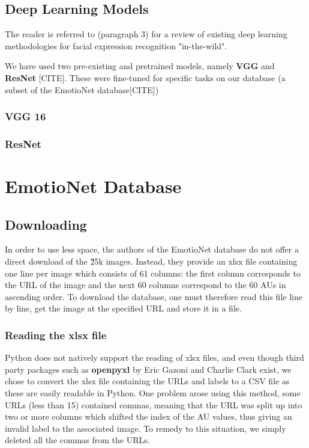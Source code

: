 \documentclass[12pt,twoside]{article}
\begin{document}
\subsection{Deep Learning Models}

The reader is referred to \cite{RefWorks:2} (paragraph 3) for a review of existing deep learning methodologies for facial expression recognition "in-the-wild".

We have used two pre-existing and pretrained models, namely \textbf{VGG} \cite{RefWorks:21} and
\textbf{ResNet} [CITE]. These were fine-tuned for specific tasks on our
database (a subset of the EmotioNet database[CITE])

\subsubsection{VGG 16}

\subsubsection{ResNet}

\section{EmotioNet Database}

\subsection{Downloading}

In order to use less space, the authors of the EmotioNet database do not offer a direct download of the \~25k images. Instead, they provide an xlsx file containing one line per image which consists of 61 columns: the first column corresponds to the URL of the image and the next 60 columns correspond to the 60 AUs in ascending order. To download the database, one must therefore read this file line by line, get the image at the specified URL and store it in a file. 

\subsubsection{Reading the xlsx file}

Python does not natively support the reading of xlsx files, and even though third party packages such as \textbf{openpyxl} by Eric Gazoni and Charlie Clark exist, we chose to convert the xlsx file containing the URLs and labels to a CSV file as these are easily readable in Python. One problem arose using this method, some URLs (less than 15) contained commas, meaning that the URL was split up into two or more columns which shifted the index of the AU values, thus giving an invalid label to the associated image. To remedy to this situation, we simply deleted all the commas from the URLs.
\end{document}
